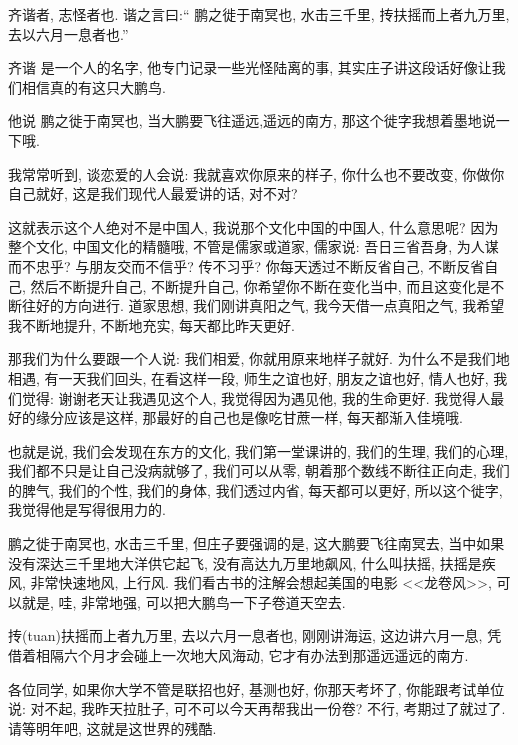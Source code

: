 \documentclass[11pt]{article}
\begin{document}
\begin{center}
	{\color{magenta} 齐谐者, 志怪者也. 谐之言曰:“ 鹏之徙于南冥也, 水击三千里, 抟扶摇而上者九万里, 去以六月一息者也.”}
\end{center}

\vspace{-0.5cm}

{\color{blue} 齐谐} 是一个人的名字, 他专门记录一些光怪陆离的事, 其实庄子讲这段话好像让我们相信真的有这只大鹏鸟. 

他说{\color{blue} 鹏之徙于南冥也}, 当大鹏要飞往遥远,遥远的南方, 那这个徙字我想着墨地说一下哦. 

我常常听到, 谈恋爱的人会说: 我就喜欢你原来的样子, 你什么也不要改变, 你做你自己就好, 这是我们现代人最爱讲的话, 对不对?  

这就表示这个人绝对不是中国人, 我说那个文化中国的中国人, 什么意思呢? 因为整个文化, 中国文化的精髓哦, 不管是儒家或道家, 儒家说: 吾日三省吾身, 为人谋而不忠乎? 与朋友交而不信乎? 传不习乎? 你每天透过不断反省自己, 不断反省自己, 然后不断提升自己, 不断提升自己, 你希望你不断在变化当中, 而且这变化是不断往好的方向进行. 道家思想, 我们刚讲真阳之气, 我今天借一点真阳之气, 我希望我不断地提升, 不断地充实, 每天都比昨天更好.

那我们为什么要跟一个人说: 我们相爱, 你就用原来地样子就好. 为什么不是我们地相遇, 有一天我们回头, 在看这样一段, 师生之谊也好, 朋友之谊也好, 情人也好, 我们觉得: 谢谢老天让我遇见这个人, 我觉得因为遇见他, 我的生命更好. 我觉得人最好的缘分应该是这样, 那最好的自己也是像吃甘蔗一样, 每天都渐入佳境哦.

也就是说, 我们会发现在东方的文化, 我们第一堂课讲的, 我们的生理, 我们的心理, 我们都不只是让自己没病就够了, 我们可以从零, 朝着那个数线不断往正向走, 我们的脾气, 我们的个性, 我们的身体, 我们透过内省, 每天都可以更好, 所以这个徙字, 我觉得他是写得很用力的.

{\color{blue} 鹏之徙于南冥也, 水击三千里}, 但庄子要强调的是, 这大鹏要飞往南冥去, 当中如果没有深达三千里地大洋供它起飞, 没有高达九万里地飙风, 什么叫扶摇, 扶摇是疾风, 非常快速地风, 上行风. 我们看古书的注解会想起美国的电影 <<龙卷风>>, 可以就是, 哇, 非常地强, 可以把大鹏鸟一下子卷道天空去.

{\color{blue} 抟(tuan)扶摇而上者九万里, 去以六月一息者也}, 刚刚讲海运, 这边讲六月一息, 凭借着相隔六个月才会碰上一次地大风海动, 它才有办法到那遥远遥远的南方.

各位同学, 如果你大学不管是联招也好, 基测也好, 你那天考坏了, 你能跟考试单位说: 对不起, 我昨天拉肚子, 可不可以今天再帮我出一份卷? 不行, 考期过了就过了. 请等明年吧, 这就是这世界的残酷.
\end{document}
